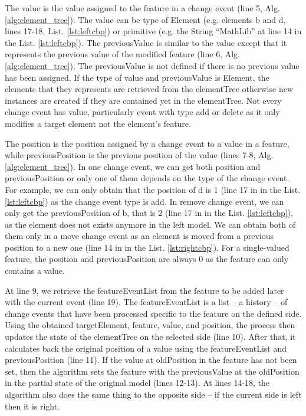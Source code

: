 \documentclass{llncs}
\begin{document}
The \textsf{value} is the value assigned to the feature in a change event (line 5, Alg. \ref{alg:element_tree}). The \textsf{value} can be type of \textsf{Element} (e.g. elements \textsf{b} and  \textsf{d}, lines 17-18, List. \ref{lst:leftcbp}) or primitive (e.g. the String ``MathLib'' at line 14 in the List. \ref{lst:leftcbp}). The \textsf{previousValue} is similar to the \textsf{value} except that it represents the previous value of the modified feature (line 6, Alg. \ref{alg:element_tree}). The \textsf{previousValue} is not defined if there is no previous value has been assigned. If the type of \textsf{value} and \textsf{previousValue} is \textsf{Element}, the elements that they represents are retrieved from the \textsf{elementTree} otherwise new instances are created if they are contained yet in the \textsf{elementTree}. Not every change event has \textsf{value}, particularly event with type \textsf{add} or \textsf{delete} as it only modifies a target element not the element's feature.

The \textsf{position} is the position assigned by a change event to a value in a feature, while \textsf{previousPosition} is the previous position of the value (lines 7-8, Alg. \ref{alg:element_tree}). In one change event, we can get both \textsf{position} and \textsf{previousPosition} or only one of them depends on the type of the change event. For example, we can only obtain that the \textsf{position} of \textsf{d} is 1 (line 17 in in the List. \ref{lst:leftcbp}) as the change event type is \textsf{add}. In \textsf{remove} change event, we can only get the \textsf{previousPosition} of \textsf{b}, that is 2 (line 17 in in the List. \ref{lst:leftcbp}), as the element does not exists anymore in the left model. We can obtain both of them only in a \textsf{move} change event as an element is moved from a previous position to a new one (line 14 in in the List. \ref{lst:rightcbp}). For a single-valued feature, the \textsf{position} and \textsf{previousPosition} are always 0 as the feature can only contains a value. 

At line 9, we retrieve the \textsf{featureEventList} from the \textsf{feature} to be added later with the current \textsf{event} (line 19). The \textsf{featureEventList} is a list -- a history -- of change events that have been processed specific to the \textsf{feature} on the defined \textsf{side}. Using the obtained \textsf{targetElement}, \textsf{feature}, \textsf{value}, and \textsf{position}, the process then updates the state of the \textsf{elementTree} on the selected \textsf{side} (line 10). After that, it calculates back the original position of a value using the \textsf{featureEventList} and \textsf{previousPosition} (line 11). If the value at \textsf{oldPosition} in the \textsf{feature} has not been set, then the algorithm sets the \textsf{feature} with the \textsf{previousValue} at the \textsf{oldPosition} in the partial state of the original model (lines 12-13). At lines 14-18, the algorithm also does the same thing to the opposite side -- if the current \textsf{side} is \textsf{left} then it is \textsf{right}.  
\end{document}
